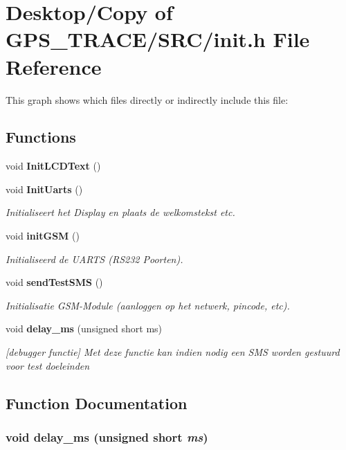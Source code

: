 \section{Desktop/Copy of GPS\_\-TRACE/SRC/init.h File Reference}
\label{init_8h}


This graph shows which files directly or indirectly include this file:\subsection*{Functions}
\begin{CompactItemize}
\item 
void {\bf InitLCDText} ()
\item 
void {\bf InitUarts} ()
\begin{CompactList}\small\item\em Initialiseert het Display en plaats de welkomstekst etc. \item\end{CompactList}\item 
void {\bf initGSM} ()
\begin{CompactList}\small\item\em Initialiseerd de UARTS (RS232 Poorten). \item\end{CompactList}\item 
void {\bf sendTestSMS} ()
\begin{CompactList}\small\item\em Initialisatie GSM-Module (aanloggen op het netwerk, pincode, etc). \item\end{CompactList}\item 
void {\bf delay\_\-ms} (unsigned short ms)
\begin{CompactList}\small\item\em [debugger functie] Met deze functie kan indien nodig een SMS worden gestuurd voor test doeleinden \item\end{CompactList}\end{CompactItemize}


\subsection{Function Documentation}
\subsubsection{\setlength{\rightskip}{0pt plus 5cm}void delay\_\-ms (unsigned short {\em ms})}\label{init_8h_a1ba68fc7ab966105fae607da326be4c}


